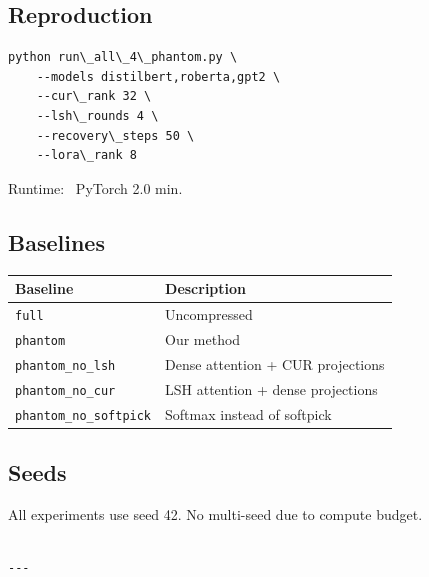 \subsection{Reproduction}

\begin{lstlisting}
python run\_all\_4\_phantom.py \
    --models distilbert,roberta,gpt2 \
    --cur\_rank 32 \
    --lsh\_rounds 4 \
    --recovery\_steps 50 \
    --lora\_rank 8
\end{lstlisting}

Runtime: ~PyTorch 2.0 min.

\subsection{Baselines}

\begin{table}[H]
\centering
\small
\begin{tabular}{ll}
\toprule
\textbf{Baseline} & \textbf{Description} \\
\midrule
\texttt{full} & Uncompressed \\
\texttt{phantom} & Our method \\
\texttt{phantom\_no\_lsh} & Dense attention + CUR projections \\
\texttt{phantom\_no\_cur} & LSH attention + dense projections \\
\texttt{phantom\_no\_softpick} & Softmax instead of softpick \\
\bottomrule
\end{tabular}
\end{table}

\subsection{Seeds}

All experiments use seed 42. No multi-seed due to compute budget.
\begin{lstlisting}

---
\end{lstlisting}